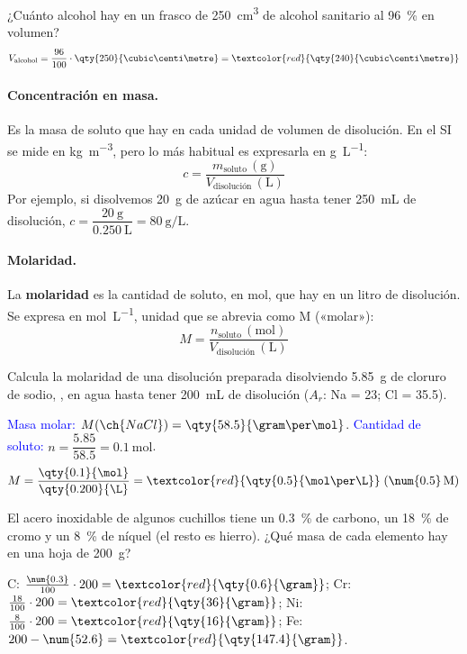 \begin{example}
    ¿Cuánto alcohol hay en un frasco de \qty{250}{\cubic\centi\metre} de alcohol sanitario al \qty{96}{\percent} en volumen?
    \[ V_\text{alcohol} = \frac{96}{100} \cdot \qty{250}{\cubic\centi\metre} = \textcolor{red}{\qty{240}{\cubic\centi\metre}} \]
\end{example}

\paragraph{Concentración en masa.} Es la masa de soluto que hay en cada unidad de volumen de disolución. En el SI se mide en \unit{\kg\per\cubic\metre}, pero lo más habitual es expresarla en \unit{\gram\per\L}:
\[ c = \frac{m_\text{soluto}\,(\unit{\gram})}{V_\text{disolución}\,(\unit{\L})} \]
Por ejemplo, si disolvemos \qty{20}{\gram} de azúcar en agua hasta tener \qty{250}{\mL} de disolución, \(c = \dfrac{\qty{20}{\gram}}{\qty{0.250}{\L}} = \qty{80}{\gram\per\L}\).

\paragraph{Molaridad.}

\begin{definition}[Molaridad, \(M\)]
    La \textbf{molaridad} es la cantidad de soluto, en mol, que hay en un litro de disolución. Se expresa en \unit{\mol\per\L}, unidad que se abrevia como M («molar»):
    \[ M = \frac{n_\text{soluto}\,(\unit{\mol})}{V_\text{disolución}\,(\unit{\L})} \]
\end{definition}

\begin{example}
    Calcula la molaridad de una disolución preparada disolviendo \qty{5.85}{\gram} de cloruro de sodio, , en agua hasta tener \qty{200}{\mL} de disolución (\(A_r\): Na = 23; Cl = \num{35.5}).

    \textcolor{blue}{Masa molar:} \(M(\ch{NaCl}) = \qty{58.5}{\gram\per\mol}\). \quad \textcolor{blue}{Cantidad de soluto:} \(n = \dfrac{\num{5.85}}{\num{58.5}} = \qty{0.1}{\mol}\).
    \[ M = \frac{\qty{0.1}{\mol}}{\qty{0.200}{\L}} = \textcolor{red}{\qty{0.5}{\mol\per\L}} \;(\num{0.5}\,\text{M}) \]
\end{example}

\begin{exercise}
    El acero inoxidable de algunos cuchillos tiene un \qty{0.3}{\percent} de carbono, un \qty{18}{\percent} de cromo y un \qty{8}{\percent} de níquel (el resto es hierro). ¿Qué masa de cada elemento hay en una hoja de \qty{200}{\gram}?
    \begin{solu}
        C: \(\frac{\num{0.3}}{100} \cdot 200 = \textcolor{red}{\qty{0.6}{\gram}}\); Cr: \(\frac{18}{100} \cdot 200 = \textcolor{red}{\qty{36}{\gram}}\); Ni: \(\frac{8}{100} \cdot 200 = \textcolor{red}{\qty{16}{\gram}}\); Fe: \(200 - \num{52.6} = \textcolor{red}{\qty{147.4}{\gram}}\).
    \end{solu}
\end{exercise}

